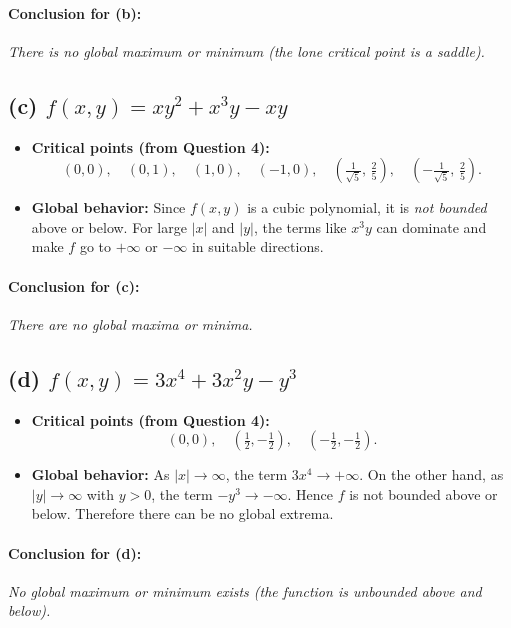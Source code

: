 \documentclass[12pt]{article}
\begin{document}
\paragraph{Conclusion for (b):}
\emph{There is no global maximum or minimum (the lone critical point is a saddle).}
\newpage
\subsection*{(c) \texorpdfstring{$f(x, y) = xy^2 + x^3y - xy$}{f(x, y) = xy^2 + x^3y - xy}}

\begin{itemize}
    \item \textbf{Critical points (from Question 4):} 
    \[
       (0,0),\quad (0,1),\quad (1,0),\quad (-1,0),\quad 
       \left(\tfrac{1}{\sqrt{5}},\, \tfrac{2}{5}\right),\quad
       \left(-\tfrac{1}{\sqrt{5}},\, \tfrac{2}{5}\right).
    \]
    \item \textbf{Global behavior:}
    Since $f(x,y)$ is a cubic polynomial, it is \emph{not bounded} above or below. 
    For large $|x|$ and $|y|$, the terms like $x^3y$ can dominate and make $f$ go to 
    $+\infty$ or $-\infty$ in suitable directions.
\end{itemize}

\paragraph{Conclusion for (c):} 
\emph{There are no global maxima or minima.}
\newpage
\subsection*{(d) \texorpdfstring{$f(x, y) = 3x^4 + 3x^2y - y^3$}{f(x, y) = 3x^4 + 3x^2y - y^3}}

\begin{itemize}
    \item \textbf{Critical points (from Question 4):}
    \[
       (0,0),\quad \left(\tfrac{1}{2}, -\tfrac{1}{2}\right),\quad \left(-\tfrac{1}{2}, -\tfrac{1}{2}\right).
    \]
    \item \textbf{Global behavior:} 
    As $|x|\to \infty$, the term $3x^4 \to +\infty$. 
    On the other hand, as $|y| \to \infty$ with $y>0$, the term $-y^3 \to -\infty$. 
    Hence $f$ is not bounded above or below. 
    Therefore there can be no global extrema.
\end{itemize}

\paragraph{Conclusion for (d):} 
\emph{No global maximum or minimum exists (the function is unbounded above and below).}
\end{document}
